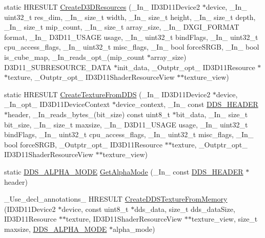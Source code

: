 \begin{DoxyCompactItemize}
\item 
static H\+R\+E\+S\+U\+LT \hyperlink{namespacemage_a45746b9c8018b682c999fe1c5d4158db}{Create\+D3\+D\+Resources} (\+\_\+\+In\+\_\+ I\+D3\+D11\+Device2 $\ast$device, \+\_\+\+In\+\_\+ uint32\+\_\+t res\+\_\+dim, \+\_\+\+In\+\_\+ size\+\_\+t width, \+\_\+\+In\+\_\+ size\+\_\+t height, \+\_\+\+In\+\_\+ size\+\_\+t depth, \+\_\+\+In\+\_\+ size\+\_\+t mip\+\_\+count, \+\_\+\+In\+\_\+ size\+\_\+t array\+\_\+size, \+\_\+\+In\+\_\+ D\+X\+G\+I\+\_\+\+F\+O\+R\+M\+AT format, \+\_\+\+In\+\_\+ D3\+D11\+\_\+\+U\+S\+A\+GE usage, \+\_\+\+In\+\_\+ uint32\+\_\+t bind\+Flags, \+\_\+\+In\+\_\+ uint32\+\_\+t cpu\+\_\+access\+\_\+flags, \+\_\+\+In\+\_\+ uint32\+\_\+t misc\+\_\+flags, \+\_\+\+In\+\_\+ bool force\+S\+R\+GB, \+\_\+\+In\+\_\+ bool is\+\_\+cube\+\_\+map, \+\_\+\+In\+\_\+reads\+\_\+opt\+\_\+(mip\+\_\+count $\ast$array\+\_\+size) D3\+D11\+\_\+\+S\+U\+B\+R\+E\+S\+O\+U\+R\+C\+E\+\_\+\+D\+A\+TA $\ast$init\+\_\+data, \+\_\+\+Outptr\+\_\+opt\+\_\+ I\+D3\+D11\+Resource $\ast$$\ast$texture, \+\_\+\+Outptr\+\_\+opt\+\_\+ I\+D3\+D11\+Shader\+Resource\+View $\ast$$\ast$texture\+\_\+view)
\item 
static H\+R\+E\+S\+U\+LT \hyperlink{namespacemage_a53fb464961d52002316f17c59ce58078}{Create\+Texture\+From\+D\+DS} (\+\_\+\+In\+\_\+ I\+D3\+D11\+Device2 $\ast$device, \+\_\+\+In\+\_\+opt\+\_\+ I\+D3\+D11\+Device\+Context $\ast$device\+\_\+context, \+\_\+\+In\+\_\+ const \hyperlink{structmage_1_1_d_d_s___h_e_a_d_e_r}{D\+D\+S\+\_\+\+H\+E\+A\+D\+ER} $\ast$header, \+\_\+\+In\+\_\+reads\+\_\+bytes\+\_\+(bit\+\_\+size) const uint8\+\_\+t $\ast$bit\+\_\+data, \+\_\+\+In\+\_\+ size\+\_\+t bit\+\_\+size, \+\_\+\+In\+\_\+ size\+\_\+t maxsize, \+\_\+\+In\+\_\+ D3\+D11\+\_\+\+U\+S\+A\+GE usage, \+\_\+\+In\+\_\+ uint32\+\_\+t bind\+Flags, \+\_\+\+In\+\_\+ uint32\+\_\+t cpu\+\_\+access\+\_\+flags, \+\_\+\+In\+\_\+ uint32\+\_\+t misc\+\_\+flags, \+\_\+\+In\+\_\+ bool force\+S\+R\+GB, \+\_\+\+Outptr\+\_\+opt\+\_\+ I\+D3\+D11\+Resource $\ast$$\ast$texture, \+\_\+\+Outptr\+\_\+opt\+\_\+ I\+D3\+D11\+Shader\+Resource\+View $\ast$$\ast$texture\+\_\+view)
\item 
static \hyperlink{namespacemage_a0c586a2bad862f4858900ca121ca80c2}{D\+D\+S\+\_\+\+A\+L\+P\+H\+A\+\_\+\+M\+O\+DE} \hyperlink{namespacemage_afcc0891e1660f8457696cb30f4ee518a}{Get\+Alpha\+Mode} (\+\_\+\+In\+\_\+ const \hyperlink{structmage_1_1_d_d_s___h_e_a_d_e_r}{D\+D\+S\+\_\+\+H\+E\+A\+D\+ER} $\ast$header)
\item 
\+\_\+\+Use\+\_\+decl\+\_\+annotations\+\_\+ H\+R\+E\+S\+U\+LT \hyperlink{namespacemage_a1570abdb85a5a68b2d78944b2446f98d}{Create\+D\+D\+S\+Texture\+From\+Memory} (I\+D3\+D11\+Device2 $\ast$device, const uint8\+\_\+t $\ast$dds\+\_\+data, size\+\_\+t dds\+\_\+data\+Size, I\+D3\+D11\+Resource $\ast$$\ast$texture, I\+D3\+D11\+Shader\+Resource\+View $\ast$$\ast$texture\+\_\+view, size\+\_\+t maxsize, \hyperlink{namespacemage_a0c586a2bad862f4858900ca121ca80c2}{D\+D\+S\+\_\+\+A\+L\+P\+H\+A\+\_\+\+M\+O\+DE} $\ast$alpha\+\_\+mode)

\end{DoxyCompactItemize}
